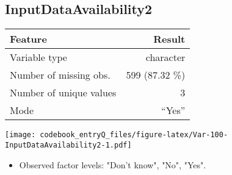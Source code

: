 \documentclass[]{article}
\providecommand{\tightlist}{%
  \setlength{\itemsep}{0pt}\setlength{\parskip}{0pt}}
\newcommand{\fullline}{\noindent\makebox[\linewidth]{\rule{\textwidth}{0.4pt}}}
\newcommand{\bminione}{\begin{minipage}{0.75 \textwidth}}
\newcommand{\bminitwo}{\begin{minipage}{0.25 \textwidth}}
\newcommand{\emini}{\end{minipage}}
\begin{document}
\fullline

\hypertarget{inputdataavailability2}{\subsection{InputDataAvailability2}\label{inputdataavailability2}}

\bminione

\begin{longtable}[]{@{}lr@{}}
\toprule
\begin{minipage}[b]{0.34\columnwidth}\raggedright\strut
Feature\strut
\end{minipage} & \begin{minipage}[b]{0.20\columnwidth}\raggedleft\strut
Result\strut
\end{minipage}\tabularnewline
\midrule
\endhead
\begin{minipage}[t]{0.34\columnwidth}\raggedright\strut
Variable type\strut
\end{minipage} & \begin{minipage}[t]{0.20\columnwidth}\raggedleft\strut
character\strut
\end{minipage}\tabularnewline
\begin{minipage}[t]{0.34\columnwidth}\raggedright\strut
Number of missing obs.\strut
\end{minipage} & \begin{minipage}[t]{0.20\columnwidth}\raggedleft\strut
599 (87.32 \%)\strut
\end{minipage}\tabularnewline
\begin{minipage}[t]{0.34\columnwidth}\raggedright\strut
Number of unique values\strut
\end{minipage} & \begin{minipage}[t]{0.20\columnwidth}\raggedleft\strut
3\strut
\end{minipage}\tabularnewline
\begin{minipage}[t]{0.34\columnwidth}\raggedright\strut
Mode\strut
\end{minipage} & \begin{minipage}[t]{0.20\columnwidth}\raggedleft\strut
``Yes''\strut
\end{minipage}\tabularnewline
\bottomrule
\end{longtable}

\emini
\bminitwo
\texttt{[image: codebook\_entryQ\_files/figure-latex/Var-100-InputDataAvailability2-1.pdf]}
\emini

\begin{itemize}
\tightlist
\item
  Observed factor levels: "Don't know", "No", "Yes".
\end{itemize}
\end{document}
